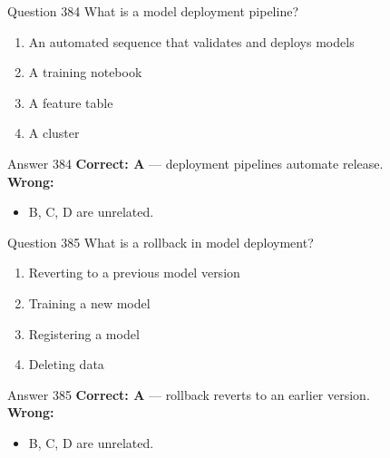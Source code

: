 \documentclass[aspectratio=169,11pt]{beamer}
\begin{document}
	\begin{frame}{Question 384}
		What is a model deployment pipeline?
		\begin{enumerate}[label=\Alph*.]
			\item An automated sequence that validates and deploys models
			\item A training notebook
			\item A feature table
			\item A cluster
		\end{enumerate}
	\end{frame}
	\begin{frame}{Answer 384}
		\textbf{Correct: A} --- deployment pipelines automate release.\\
		\vspace{0.5em}
		\textbf{Wrong:}
		\begin{itemize}
			\item B, C, D are unrelated.
		\end{itemize}
	\end{frame}
	
	\begin{frame}{Question 385}
		What is a rollback in model deployment?
		\begin{enumerate}[label=\Alph*.]
			\item Reverting to a previous model version
			\item Training a new model
			\item Registering a model
			\item Deleting data
		\end{enumerate}
	\end{frame}
	\begin{frame}{Answer 385}
		\textbf{Correct: A} --- rollback reverts to an earlier version.\\
		\vspace{0.5em}
		\textbf{Wrong:}
		\begin{itemize}
			\item B, C, D are unrelated.
		\end{itemize}
	\end{frame}
	
\end{document}
